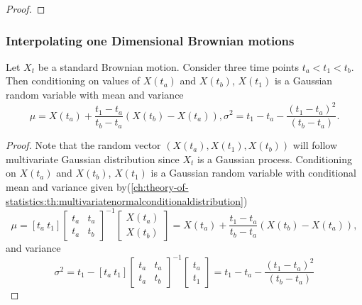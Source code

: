 \begin{refsection}
\begin{proof}
\end{proof}

\subsubsection{Interpolating one Dimensional Brownian motions}
\begin{lemma}
Let $X_t$ be a standard Brownian motion. Consider three time points $t_a<t_1<t_b$. Then conditioning on values of $X(t_a)$ and $X(t_b)$,
$X(t_1)$ is a Gaussian random variable with mean and variance $$\mu = X(t_a) + \frac{t_1-t_a}{t_b-t_a}(X(t_b)-X(t_a)), \sigma^2 = t_1-t_a - \frac{(t_1-t_a)^2}{(t_b-t_a)}.$$
\end{lemma}
\begin{proof}
Note that the random vector $(X(t_a), X(t_1),X(t_b))$ will follow multivariate Gaussian distribution since $X_t$ is a Gaussian process. Conditioning on $X(t_a)$ and $X(t_b)$, $X(t_1)$ is a Gaussian random variable with conditional mean and variance given by(\autoref{ch:theory-of-statistics:th:multivariatenormalconditionaldistribution}) $$\mu=[t_a ~ t_1]\begin{bmatrix}
t_a & t_a\\
t_a & t_b
\end{bmatrix}^{-1}\begin{bmatrix}
X(t_a)\\
X(t_b)
\end{bmatrix} = X(t_a) + \frac{t_1-t_a}{t_b-t_a}(X(t_b)-X(t_a)),$$
and
variance
$$\sigma^2 = t_1 - [t_a ~ t_1]\begin{bmatrix}
t_a & t_a\\
t_a & t_b
\end{bmatrix}^{-1}\begin{bmatrix}
t_a\\
t_1
\end{bmatrix}= t_1-t_a - \frac{(t_1-t_a)^2}{(t_b-t_a)}$$
\end{proof}


\end{refsection}
